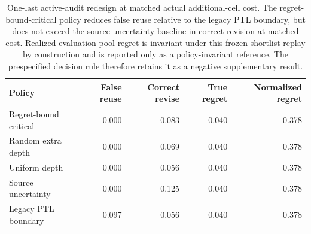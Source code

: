 \begin{table}[H]
\centering
\caption{One-last active-audit redesign at matched actual additional-cell
cost. The regret-bound-critical policy reduces false reuse relative to the
legacy PTL boundary, but does not exceed the source-uncertainty baseline in
correct revision at matched cost. Realized evaluation-pool regret is invariant
under this frozen-shortlist replay by construction and is reported only as a
policy-invariant reference. The prespecified decision rule therefore retains it
as a negative supplementary result.}
\label{tab:regret-bound-critical}
\small
\begin{tabular}{lrrrr}
\toprule
Policy & False reuse & Correct revise & True regret & Normalized regret \\
\midrule
Regret-bound critical & 0.000 & 0.083 & 0.040 & 0.378 \\
Random extra depth & 0.000 & 0.069 & 0.040 & 0.378 \\
Uniform depth & 0.000 & 0.056 & 0.040 & 0.378 \\
Source uncertainty & 0.000 & 0.125 & 0.040 & 0.378 \\
Legacy PTL boundary & 0.097 & 0.056 & 0.040 & 0.378 \\
\bottomrule
\end{tabular}
\end{table}
